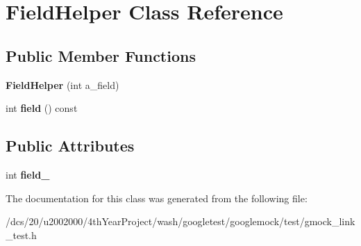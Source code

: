 \hypertarget{classFieldHelper}{}\section{Field\+Helper Class Reference}
\label{classFieldHelper}
\subsection*{Public Member Functions}
\begin{DoxyCompactItemize}
\item 
\mbox{\label{classFieldHelper_a06729cbd5da2993e8007cb62f1d00b3a}} 
{\bfseries Field\+Helper} (int a\+\_\+field)
\item 
\mbox{\label{classFieldHelper_af2959e142813205aeeb4d2ad27430ad3}} 
int {\bfseries field} () const
\end{DoxyCompactItemize}
\subsection*{Public Attributes}
\begin{DoxyCompactItemize}
\item 
\mbox{\label{classFieldHelper_a50a7ec9efc60377363d5ce8bea1708ac}} 
int {\bfseries field\+\_\+}
\end{DoxyCompactItemize}


The documentation for this class was generated from the following file\+:\begin{DoxyCompactItemize}
\item 
/dcs/20/u2002000/4th\+Year\+Project/wash/googletest/googlemock/test/gmock\+\_\+link\+\_\+test.\+h\end{DoxyCompactItemize}
